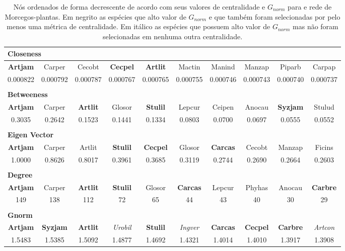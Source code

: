 \documentclass[
  12pt,
]{article}
\begin{document}
\begin{table}[!ht]
\caption{Nós ordenados de forma decrescente de acordo com seus valores de centralidade e $G_{norm}$ para e rede de Morcegos-plantas. Em negrito as espécies que alto valor de $G_{norm}$ e que também foram selecionadas por pelo menos uma métrica de centralidade. Em itálico as espécies que possuem alto valor de $G_{norm}$ mas não foram selecionadas em nenhuma outra centralidade.}\label{table:centr_raw_bats}
\footnotesize
\begin{tabular}{cccccccccc}
\multicolumn{10}{l}{ \textbf{Closeness} } \\
\hline
\textbf{Artjam} & Carper & Cecobt & \textbf{Cecpel} & \textbf{Artlit} & Mactin & Manind & Manzap & Piparb & Carpap \\
\hline
\hline
0.000822 & 0.000792 & 0.000787 & 0.000767 & 0.000765 & 0.000755 & 0.000746 & 0.000743 & 0.000740 & 0.000737 \\
\hline
& & & & & & & & & \\
\multicolumn{10}{l}{ \textbf{Betweeness} } \\
\hline
\textbf{Artjam} & Carper & \textbf{Artlit} & Glosor & \textbf{Stulil} & Lepcur & Ceipen & Anocau & \textbf{Syzjam} & Stulud \\
\hline
\hline
0.3035 & 0.2642 & 0.1523 & 0.1441 & 0.1334 & 0.0803 & 0.0700 & 0.0697 & 0.0555 & 0.0552 \\
\hline
& & & & & & & & & \\
\multicolumn{10}{l}{ \textbf{Eigen Vector} } \\
\hline
\textbf{Artjam} & Carper & Artlit & \textbf{Stulil} & \textbf{Cecpel} & Glosor & \textbf{Carcas} & Cecobt & Manzap & Ficins \\
\hline
\hline
1.0000 & 0.8626 & 0.8017 & 0.3961 & 0.3685 & 0.3119 & 0.2744 & 0.2690 & 0.2664 & 0.2603 \\
\hline
& & & & & & & & & \\
\multicolumn{10}{l}{ \textbf{Degree} } \\
\hline
\textbf{Artjam} & Carper & \textbf{Artlit} & \textbf{Stulil} & Glosor & \textbf{Carcas} & Lepcur & Phyhas & Anocau & \textbf{Carbre} \\
\hline
\hline
149 & 138 & 112 & 72 & 65 & 44 & 43 & 40 & 30 & 29 \\
\hline
& & & & & & & & & \\
\multicolumn{10}{l}{ \textbf{Gnorm} } \\
\hline
\textbf{Artjam} & \textbf{Syzjam} & \textbf{Artlit} & \textit{Urobil} & \textbf{Stulil} & \textit{Ingver} & \textbf{Carcas} & \textbf{Cecpel} & \textbf{Carbre} & \textit{Artcon} \\
\hline
\hline
1.5483 & 1.5385 & 1.5092 & 1.4877 & 1.4692 & 1.4321 & 1.4014 & 1.4010 & 1.3917 & 1.3908 \\
\hline
\end{tabular}
\end{table}
\end{document}
